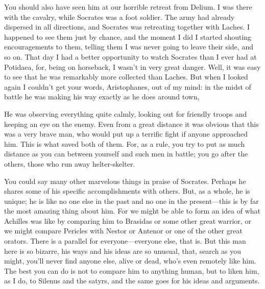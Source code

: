 You should also have seen him at our horrible retreat
from Delium. I was
there with the cavalry, while Socrates was a foot soldier. The army had
already dispersed in all directions, and Socrates was retreating
together with Laches. I happened to see them just by chance, and the
moment I did I started shouting encouragements to them, telling them I
was never going to leave their side, and so on. That day I had a better
opportunity  to watch Socrates than I ever had at Potidaea, for,
being on horseback, I wasn’t in very great danger. Well, it was easy to
see that he was remarkably more collected than Laches. But when I looked
again I couldn’t get your words, Aristophanes, out of my mind: in the
midst of battle he was making his way exactly as he does around
town,

\blank[line]


\blank[line]

He was observing everything quite calmly, looking out for friendly
troops and keeping an eye on the enemy. Even from a great distance it
was obvious that this was a very brave man, who would put up a terrific
fight if anyone approached him. This is what saved both of them. For, as
a rule, you try to put as much distance as you can between yourself and
such men in battle; you go after the others, those who run away
helter-skelter. 

You could say many other marvelous things in praise of Socrates. Perhaps
he shares some of his specific accomplishments with others. But, as a
whole, he is unique; he is like no one else in the past and no one in
the present---this is by far the most amazing thing about him. For we
might be able to form an idea of what Achilles was like by comparing him
to Brasidas or some other great warrior, or we might compare Pericles
with Nestor or Antenor or one of the other great
orators. There is a
parallel  for everyone---everyone else, that is. But this man
here is so bizarre, his ways and his ideas are so unusual, that, search
as you might, you’ll never find anyone else, alive or dead, who’s even
remotely like him. The best you can do is not to compare him to anything
human, but to liken him, as I do, to Silenus and the satyrs, and the
same goes for his ideas and arguments.

